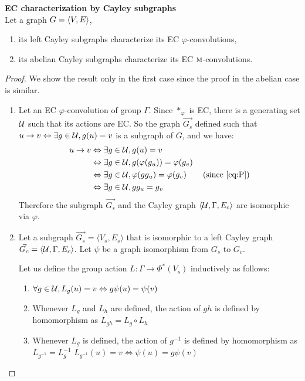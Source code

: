 \begin{theorem}\textbf{EC characterization by Cayley subgraphs}\\
Let a graph $G = \langle V, E \rangle$,
\begin{enumerate}[nolistsep,noitemsep,label=(\roman*)]
\item its left Cayley subgraphs characterize its EC $\varphi$-convolutions,
\item its abelian Cayley subgraphs characterize its EC $\operatorname{\textsc{m}}$-convolutions.
\end{enumerate}
\label{th:cayleychar}
\end{theorem}

\begin{proof}
We show the result only in the first case since the proof in the abelian case is similar.
\begin{enumerate}
	\item Let an EC $\varphi$-convolution of group $\Gamma$. Since $\ast_\varphi$ is EC, there is a generating set $\mathcal{U}$ such that its actions are EC.
  So the graph $\vec{G_s}$ defined such that $u \to v \Leftrightarrow \exists g \in \mathcal{U}, g(u) = v$ is a subgraph of $G$, and we have:
  \begin{align*}
  u \to v & \Leftrightarrow \exists g \in \cu, g(u) = v\\
          & \Leftrightarrow \exists g \in \cu, g(\varphi(g_u)) = \varphi(g_v)\\
          & \Leftrightarrow \exists g \in \cu, \varphi(gg_u) = \varphi(g_v) \tag{since \eqref{eq:P}}\\
          & \Leftrightarrow \exists g \in \cu, gg_u = g_v
  \end{align*}
  Therefore the subgraph $\vec{G_s}$ and the Cayley graph $\langle \mathcal{U}, \Gamma, E_c \rangle$ are isomorphic via $\varphi$.

	\item Let a subgraph $\vec{G_s} = \langle V_s, E_s \rangle$ that is isomorphic to a left Cayley graph $\vec{G_c} = \langle \mathcal{U}, \Gamma, E_c \rangle$. Let $\psi$ be a graph isomorphism from $G_s$ to $G_c$.%

Let us define the group action $L : \Gamma \to \Phi^*(V_s)$ inductively as follows:
\begin{enumerate}[label=(\alph*)]
  \item $\forall g \in \mathcal{U}, L_g(u) = v \Leftrightarrow g\psi(u) = \psi(v)$ \label{enum:a}
  \item Whenever $L_g$ and $L_h$ are defined, the action of $gh$ is defined by homomorphism as $L_{gh}= L_g \circ L_h$ \label{enum:b}
  \item Whenever $L_g$ is defined, the action of $g^{-1}$ is defined by homomorphism as $L_{g^{-1}}=L_g^{-1}$ \ie $L_{g^{-1}}(u) = v \Leftrightarrow \psi(u) = g\psi(v)$ \label{enum:c}
\end{enumerate}


\end{enumerate}
\end{proof}
